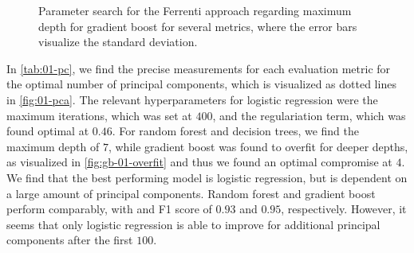\begin{table}[!ht]
\centering
\caption{A table of the optimal number of principal components and the respective scores (standard deviation) for the Ferrenti approach, as visualized in the dash-dotted line in \autoref{fig:01-pca}.}
\label{tab:01-pc}
\noindent{}
\end{table}



\begin{wrapfigure}{R}{0.5\textwidth}

  \begin{subfigure}[b]{1.0\textwidth}
  
  \end{subfigure}

  \begin{subfigure}[b]{1.0\textwidth}
  
  \end{subfigure}
  \vspace*{-130mm}
  \caption{Parameter search for the Ferrenti approach regarding maximum depth for gradient boost for several metrics, where the error bars visualize the standard deviation.}
  \label{fig:gb-01-overfit}
\end{wrapfigure}

\noindent In \autoref{tab:01-pc}, we find the precise measurements for each evaluation metric for the optimal number of principal components, which is visualized as dotted lines in \autoref{fig:01-pca}. The relevant hyperparameters for logistic regression were the maximum iterations, which was set at $400$, and the regulariation term, which was found optimal at $0.46$. For random forest and decision trees, we find the maximum depth of $7$, while gradient boost was found to overfit for deeper depths, as visualized in \autoref{fig:gb-01-overfit} and thus we found an optimal compromise at $4$. We find that the best performing model is logistic regression, but is dependent on a large amount of principal components. Random forest and gradient boost perform comparably, with and F1 score of $0.93$ and $0.95$, respectively. However, it seems that only logistic regression is able to improve for additional principal components after the first $100$.




